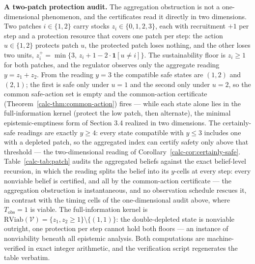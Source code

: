 \documentclass[10pt,twocolumn]{article}
\theoremstyle{definition}
\begin{document}
\textbf{A two-patch protection audit.} The aggregation obstruction is not a one-dimensional phenomenon, and the certificates read it directly in two dimensions. Two patches \(i \in \{1,2\}\) carry stocks \(z_{i} \in \{0,1,2,3\}\), each with recruitment \(+1\) per step and a protection resource that covers one patch per step: the action \(u \in \{1,2\}\) protects patch \(u\), the protected patch loses nothing, and the other loses two units, \(z_{i}^{+} = \min\{3,\, z_{i} + 1 - 2\cdot \mathbf{1}[u \neq i]\}\). The sustainability floor is \(z_{i} \ge 1\) for both patches, and the regulator observes only the aggregate reading \(y = z_{1} + z_{2}\). From the reading \(y = 3\) the compatible safe states are \((1,2)\) and \((2,1)\); the first is safe only under \(u = 1\) and the second only under \(u = 2\), so the common safe-action set is empty and the common-action certificate (Theorem~\ref{calc-thm:common-action}) fires --- while each state alone lies in the full-information kernel (protect the low patch, then alternate), the minimal epistemic-emptiness form of Section 3.4 realized in two dimensions. The certainly-safe readings are exactly \(y \ge 4\): every state compatible with \(y \le 3\) includes one with a depleted patch, so the aggregated index can certify safety only above that threshold --- the two-dimensional reading of Corollary~\ref{calc-cor:certainly-safe}. Table~\ref{calc-tab:patch} audits the aggregated beliefs against the exact belief-level recursion, in which the reading splits the belief into its \(y\)-cells at every step: every nonviable belief is certified, and all by the common-action certificate --- the aggregation obstruction is instantaneous, and no observation schedule rescues it, in contrast with the timing cells of the one-dimensional audit above, where \(T_{\mathrm{obs}} = 1\) is viable. The full-information kernel is \(\mathrm{RViab}(\mathcal{V}) = \{z_{1}, z_{2} \ge 1\} \setminus \{(1,1)\}\): the double-depleted state is nonviable outright, one protection per step cannot hold both floors --- an instance of nonviability beneath all epistemic analysis. Both computations are machine-verified in exact integer arithmetic, and the verification script regenerates the table verbatim.
\end{document}
